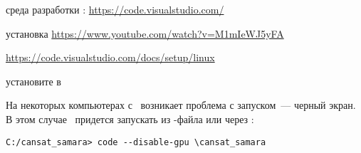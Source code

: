 \clearpage
\subsecly{\vsc}\label{vsinst}

среда разработки \vsc: \url{https://code.visualstudio.com/}

\bigskip установка \url{https://www.youtube.com/watch?v=M1mIeWJ5yFA}

\bigskip
\url{https://code.visualstudio.com/docs/setup/linux}

\bigskip
установите в 

\bigskip\noindent
На некоторых компьютерах с \win\ возникает проблема с запуском\ --- черный экран. В этом случае \vsc\ придется
запускать из -файла или через :

\begin{verbatim}
C:/cansat_samara> code --disable-gpu \cansat_samara
\end{verbatim}
